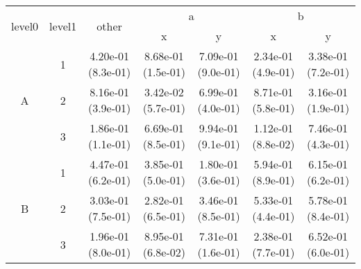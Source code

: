 \begin{tabular}{ccccccc}
\toprule
\multirow{2}{*}{level0} & \multirow{2}{*}{level1}& \multirow{2}{*}{other}&\multicolumn{2}{c}{a}&\multicolumn{2}{c}{b}\tabularnewline
\cmidrule(lr){4-5}
\cmidrule(lr){6-7}
&&&x&y&x&y\tabularnewline
\midrule
\multirow{3}{*}{A}&1& 4.20e-01 (8.3e-01)& 8.68e-01 (1.5e-01)& 7.09e-01 (9.0e-01)& 2.34e-01 (4.9e-01)& 3.38e-01 (7.2e-01)\tabularnewline
&2& 8.16e-01 (3.9e-01)& 3.42e-02 (5.7e-01)& 6.99e-01 (4.0e-01)& 8.71e-01 (5.8e-01)& 3.16e-01 (1.9e-01)\tabularnewline
&3& 1.86e-01 (1.1e-01)& 6.69e-01 (8.5e-01)& 9.94e-01 (9.1e-01)& 1.12e-01 (8.8e-02)& 7.46e-01 (4.3e-01)\tabularnewline
\midrule
\multirow{3}{*}{B}&1& 4.47e-01 (6.2e-01)& 3.85e-01 (5.0e-01)& 1.80e-01 (3.6e-01)& 5.94e-01 (8.9e-01)& 6.15e-01 (6.2e-01)\tabularnewline
&2& 3.03e-01 (7.5e-01)& 2.82e-01 (6.5e-01)& 3.46e-01 (8.5e-01)& 5.33e-01 (4.4e-01)& 5.78e-01 (8.4e-01)\tabularnewline
&3& 1.96e-01 (8.0e-01)& 8.95e-01 (6.8e-02)& 7.31e-01 (1.6e-01)& 2.38e-01 (7.7e-01)& 6.52e-01 (6.0e-01)\tabularnewline
\bottomrule
\end{tabular}
